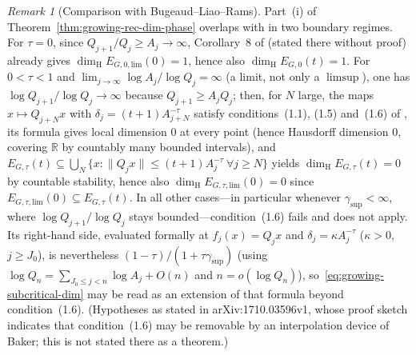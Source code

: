 \documentclass[11pt]{article}
\theoremstyle{definition}
\theoremstyle{remark}
\newtheorem{remark}[theorem]{Remark}
\newcommand{\R}{\mathbb{R}}
\newcommand{\dimH}{\dim_{\mathrm{H}}}
\begin{document}
\begin{remark}[Comparison with Bugeaud--Liao--Rams]\label{rem:growing-BLR}
Part~(i) of Theorem~\ref{thm:growing-rec-dim-phase} overlaps with \cite{BLR} in two
boundary regimes. For $\tau=0$, since $Q_{j+1}/Q_j\ge A_j\to\infty$, Corollary~8 of
\cite{BLR} (stated there without proof) already gives
$\dimH E_{G,0,\mathrm{lim}}(0)=1$, hence also
$\dimH E_{G,0}(t)=1$. For $0<\tau<1$ and $\lim_{j\to\infty}\log A_j/\log Q_j=\infty$
(a limit, not only a $\limsup$), one has $\log Q_{j+1}/\log Q_j\to\infty$ because
$Q_{j+1}\ge A_jQ_j$; then, for $N$ large, the maps $x\mapsto Q_{j+N}x$ with
$\delta_j=(t+1)A_{j+N}^{-\tau}$ satisfy conditions~(1.1), (1.5) and~(1.6) of
\cite[Theorem~7]{BLR}, its formula gives local dimension $0$ at every point (hence
Hausdorff dimension $0$, covering $\R$ by countably many bounded intervals), and
$E_{G,\tau}(t)\subseteq\bigcup_N\{x:\|Q_jx\|\le(t+1)A_j^{-\tau}\ \forall j\ge N\}$
yields $\dimH E_{G,\tau}(t)=0$ by countable stability, hence also
$\dimH E_{G,\tau,\mathrm{lim}}(0)=0$ since $E_{G,\tau,\mathrm{lim}}(0)\subseteq E_{G,\tau}(t)$.
In all other cases---in
particular whenever $\gamma_{\sup}<\infty$, where $\log Q_{j+1}/\log Q_j$ stays
bounded---condition~(1.6) fails and \cite[Theorem~7]{BLR} does not apply. Its
right-hand side, evaluated formally at $f_j(x)=Q_jx$ and $\delta_j=\kappa A_j^{-\tau}$
($\kappa>0$, $j\ge J_0$), is
nevertheless $(1-\tau)/(1+\tau\gamma_{\sup})$ (using $\log Q_n=\sum_{J_0\le j<n}\log A_j+O(n)$
and $n=o(\log Q_n)$), so~\eqref{eq:growing-subcritical-dim} may be read as an extension
of that formula beyond condition~(1.6). (Hypotheses as stated in arXiv:1710.03596v1, whose proof sketch indicates that
condition~(1.6) may be removable by an interpolation device of Baker; this is not
stated there as a theorem.)
\end{remark}
\end{document}
